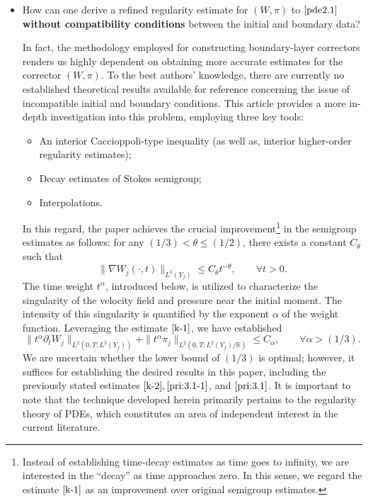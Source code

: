 \documentclass[13pt,CJK]{article}
\theoremstyle{plain}                       %
\theoremstyle{remark}
\numberwithin{equation}{section}
\begin{document}
\begin{itemize}
  \item[Q2.] How can one derive a refined regularity estimate for $(W,\pi)$ to
  $\eqref{pde2.1}$ \textbf{without compatibility conditions}
  between the initial and boundary data?

  In fact, the methodology employed for constructing boundary-layer correctors renders us highly dependent on obtaining more accurate estimates for the corrector $(W,\pi)$. To the best authors' knowledge, there are currently no established theoretical results available for reference concerning the issue of incompatible initial and boundary conditions. This article provides a more in-depth   investigation into this problem, employing three key tools:
  \begin{itemize}
    \item An interior Caccioppoli-type inequality (as well as,  interior higher-order regularity estimates);
    \item Decay estimates of Stokes semigroup;
    \item Interpolations.
  \end{itemize}
  In this regard, the paper achieves the crucial improvement\footnote{Instead of establishing time-decay estimates
as time goes to infinity, we are interested in the ``decay'' as time approaches zero.
In this sense, we regard the estimate $\eqref{k-1}$ as an improvement over original semigroup estimates.\label{footnote1}} in the semigroup estimates as follows: for any $(1/3)<\theta\leq (1/2)$, there exists a constant $C_\theta$ such that
\begin{equation}\label{k-1}
\|\nabla W_j(\cdot, t)\|_{L^2(Y_f)}
\leq C_{\theta} t^{-\theta},
\qquad\forall t>0.
\end{equation}
The time weight $t^\alpha$, introduced below, is utilized to characterize the singularity of the velocity field and pressure near the initial moment. The intensity of this singularity is quantified by the exponent $\alpha$ of the weight function. Leveraging the estimate $\eqref{k-1}$, we have established
\begin{equation}\label{k-3}
\|t^{\alpha}\partial_t W_j\|_{L^2(0,T;L^{2}(Y_f))}
+\|t^{\alpha}\pi_j\|_{L^2(0,T;L^{2}(Y_f)/\mathbb{R})}\leq C_{\alpha},
\qquad  \forall\alpha>(1/3).
\end{equation}
We are uncertain whether the lower bound of $(1/3)$ is optimal; however, it suffices for establishing the desired results in this paper, including the previously stated estimates $\eqref{k-2},\eqref{pri:3.1-1}$, and $\eqref{pri:3.1}$. It is important to note that the technique developed herein primarily pertains to the regularity theory of PDEs, which constitutes an area of independent interest in the current literature.
\end{itemize}
\end{document}
